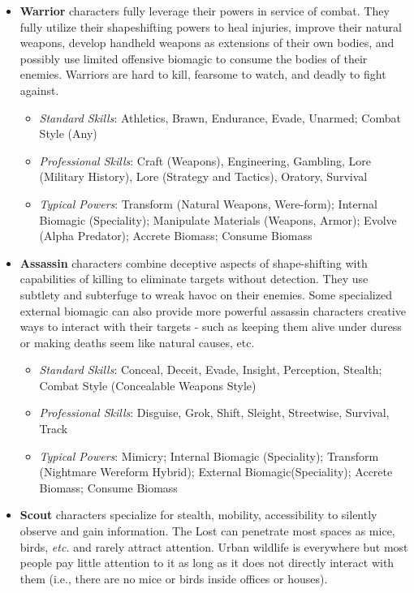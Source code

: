 \documentclass[letterpaper,serif]{rpg-module}
\begin{document}
\begin{itemize}
    \item \textbf{Warrior} characters fully leverage their powers in service of combat. They fully utilize their shapeshifting powers to heal injuries, improve their natural weapons, develop handheld weapons as extensions of their own bodies, and possibly use limited offensive biomagic to consume the bodies of their enemies. Warriors are hard to kill, fearsome to watch, and deadly to fight against.  
    \begin{itemize}
        \item \emph{Standard Skills}: Athletics, Brawn, Endurance, Evade, Unarmed; Combat Style (Any)
        \item \emph{Professional Skills}: Craft (Weapons), Engineering, Gambling, Lore (Military History), Lore (Strategy and Tactics), Oratory, Survival
        \item \emph{Typical Powers}: Transform (Natural Weapons, Were-form); Internal Biomagic (Speciality); Manipulate Materials (Weapons, Armor); Evolve (Alpha Predator); Accrete Biomass; Consume Biomass
    \end{itemize}
    \item \textbf{Assassin} characters combine deceptive aspects of shape-shifting with capabilities of killing to eliminate targets without detection. They use subtlety and subterfuge to wreak havoc on their enemies. Some specialized external biomagic can also provide more powerful assassin characters creative ways to interact with their targets - such as keeping them alive under duress or making deaths seem like natural causes, etc.
    \begin{itemize}
        \item \emph{Standard Skills}: Conceal, Deceit, Evade, Insight, Perception, Stealth; Combat Style (Concealable Weapons Style)
        \item \emph{Professional Skills}: Disguise, Grok, Shift, Sleight, Streetwise, Survival, Track
        \item \emph{Typical Powers}: Mimicry; Internal Biomagic (Speciality); Transform (Nightmare Wereform Hybrid); External Biomagic(Speciality); Accrete Biomass; Consume Biomass
    \end{itemize}
    \item \textbf{Scout} characters specialize for stealth, mobility, accessibility to silently observe and gain information. The Lost can penetrate most spaces as mice, birds, \emph{etc.} and rarely attract attention. Urban wildlife is everywhere but most people pay little attention to it as long as it does not directly interact with them (i.e., there are no mice or birds inside offices or houses). 

\end{itemize}
\end{document}
